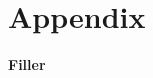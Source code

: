 \section*{Appendix}

\anhangsverzeichnis


\begin{compactitem}
\item \textbf{Filler}
\end{compactitem}
